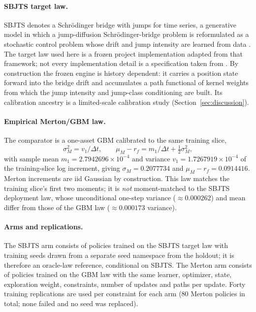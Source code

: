 \documentclass[11pt]{article}
\begin{document}
\paragraph{SBJTS target law.} SBJTS denotes a Schr\"odinger bridge with jumps for time series, a generative model in which a jump-diffusion Schr\"odinger-bridge problem is reformulated as a stochastic control problem whose drift and jump intensity are learned from data \cite{DeMarcoPhamZanni2026}. The target law used here is a frozen project implementation adapted from that framework; not every implementation detail is a specification taken from \cite{DeMarcoPhamZanni2026}. By construction the frozen engine is history dependent: it carries a position state forward into the bridge drift and accumulates a path functional of kernel weights from which the jump intensity and jump-class conditioning are built. Its calibration ancestry is a limited-scale calibration study (Section~\ref{sec:discussion}).

\paragraph{Empirical Merton/GBM law.} The comparator is a one-asset GBM calibrated to the same training slice,
\[
\sigma_M^2=v_1/\Delta t,\qquad \mu_M-r_f=m_1/\Delta t+\tfrac12\sigma_M^2,
\]
with sample mean $m_1=2.7942696\times10^{-4}$ and variance $v_1=1.7267919\times10^{-4}$ of the training-slice log increment, giving $\sigma_M=0.2077734$ and $\mu_M-r_f=0.0914416$. Merton increments are iid Gaussian by construction. This law matches the training slice's first two moments; it is \emph{not} moment-matched to the SBJTS deployment law, whose unconditional one-step variance ($\approx0.000262$) and mean differ from those of the GBM law ($\approx0.000173$ variance).

\paragraph{Arms and replications.} The SBJTS arm consists of policies trained on the SBJTS target law with training seeds drawn from a separate seed namespace from the holdout; it is therefore an oracle-law reference, conditional on SBJTS. The Merton arm consists of policies trained on the GBM law with the same learner, optimizer, state, exploration weight, constraints, number of updates and paths per update. Forty training replications are used per constraint for each arm (80 Merton policies in total; none failed and no seed was replaced).
\end{document}
